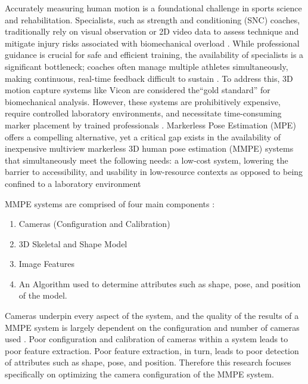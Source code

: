 \renewcommand{\labelenumii}{\arabic{enumi}.\arabic{enumii}}
\renewcommand{\labelenumiii}{\arabic{enumi}.\arabic{enumii}.\arabic{enumiii}}
\renewcommand{\labelenumiv}{\arabic{enumi}.\arabic{enumii}.\arabic{enumiii}.\arabic{enumiv}}

\label{chap:introduction}

\label{sec:background}

Accurately measuring human motion is a foundational challenge in sports science and rehabilitation. Specialists, such as strength and conditioning (SNC) coaches, traditionally rely on visual observation or 2D video data to assess technique and mitigate injury risks associated with biomechanical overload \cite{Chariar2023, Forte2023}.
While professional guidance is crucial for safe and efficient training, the availability of specialists is a significant bottleneck; coaches often manage multiple athletes simultaneously, making continuous, real-time feedback difficult to sustain \cite{Needham2021}.
To address this, 3D motion capture systems like Vicon are considered the``gold standard'' for biomechanical analysis\cite{Matsuda2025, Hansen2024, Song2022}.
However, these systems are prohibitively expensive, require controlled laboratory environments, and necessitate time-consuming marker placement by trained professionals \cite{MercadalBaudart2024, Kuster2016}.
Markerless Pose Estimation (MPE) offers a compelling alternative, yet a critical gap exists in the availability of inexpensive multiview markerless 3D human pose estimation (MMPE) systems that simultaneously meet the following needs: a low-cost system, lowering the barrier to accessibility, and usability in low-resource contexts as opposed to being confined to a laboratory environment 

MMPE systems are comprised of four main components \cite{colyer2018review}:
\begin{enumerate}
    \item Cameras (Configuration and Calibration)
    \item 3D Skeletal and Shape Model
    \item Image Features
    \item An Algorithm used to determine attributes such as shape, pose, and position of the model.
\end{enumerate}

Cameras underpin every aspect of the system, and the quality of the results of a MMPE system is largely dependent on the configuration and number of cameras used \cite{rahimian2016optimal}. Poor configuration and calibration of cameras within a system leads to poor feature extraction. Poor feature extraction, in turn, leads to poor detection of attributes such as shape, pose, and position. Therefore this research focuses specifically on optimizing the camera configuration of the MMPE system.

